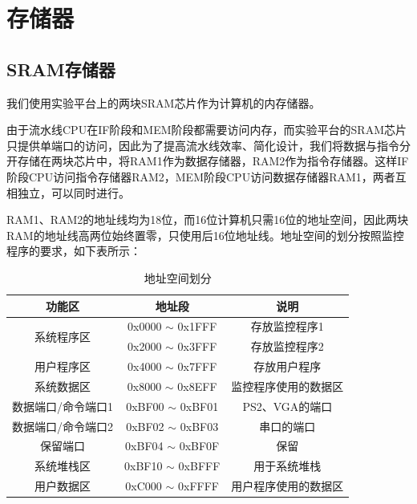 
\section{存储器}

\subsection{SRAM存储器}
我们使用实验平台上的两块SRAM芯片作为计算机的内存储器。

由于流水线CPU在IF阶段和MEM阶段都需要访问内存，而实验平台的SRAM芯片只提供单端口的访问，因此为了提高流水线效率、简化设计，我们将数据与指令分开存储在两块芯片中，将RAM1作为数据存储器，RAM2作为指令存储器。这样IF阶段CPU访问指令存储器RAM2，MEM阶段CPU访问数据存储器RAM1，两者互相独立，可以同时进行。

RAM1、RAM2的地址线均为18位，而16位计算机只需16位的地址空间，因此两块RAM的地址线高两位始终置零，只使用后16位地址线。地址空间的划分按照监控程序的要求，如下表所示：
\begin{table}[H]
\begin{center}
\renewcommand{\arraystretch}{1.3}
\caption{地址空间划分}
\label{tab:treatments}
\begin{tabular}{|c|c|c|}
\hline
功能区 & 地址段 & 说明 \\\hline
\multirow{2}{*}{系统程序区} & 0x0000 $\sim$ 0x1FFF & 存放监控程序1 \\\cline{2-3}
& 0x2000  $\sim$ 0x3FFF & 存放监控程序2 \\\hline
用户程序区 & 0x4000  $\sim$ 0x7FFF & 存放用户程序 \\\hline
系统数据区 & 0x8000  $\sim$ 0x8EFF & 监控程序使用的数据区 \\\hline
数据端口/命令端口1 & 0xBF00 $\sim$ 0xBF01 & PS2、VGA的端口 \\\hline
数据端口/命令端口2 & 0xBF02 $\sim$ 0xBF03 & 串口的端口 \\\hline
保留端口 & 0xBF04  $\sim$ 0xBF0F & 保留 \\\hline
系统堆栈区 & 0xBF10  $\sim$ 0xBFFF & 用于系统堆栈 \\\hline
用户数据区 & 0xC000  $\sim$ 0xFFFF & 用户程序使用的数据区 \\\hline
\end{tabular}
\end{center}
\end{table}

